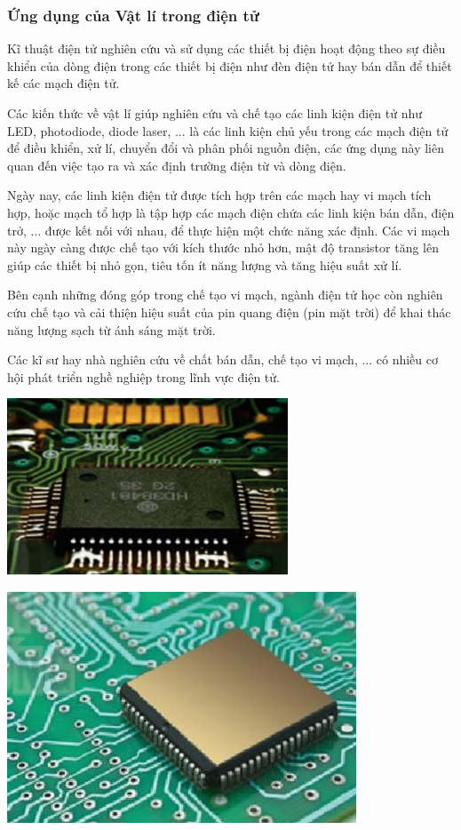 \subsubsection{Ứng dụng của Vật lí trong điện tử}
\begin{minipage}[l]{0.6\textwidth}
Kĩ thuật điện tử nghiên cứu và sử dụng các thiết bị điện hoạt động theo sự điều khiển của dòng điện trong các thiết bị điện như đèn điện tử hay bán dẫn để thiết kế các mạch điện tử.

Các kiến thức về vật lí giúp nghiên cứu và chế tạo các linh kiện điện tử như LED, photodiode, diode laser, ... là các linh kiện chủ yếu trong các mạch điện tử để điều khiển, xử lí, chuyển đổi và phân phối nguồn điện, các ứng dụng này liên quan đến việc tạo ra và xác định trường điện từ và dòng điện.

Ngày nay, các linh kiện điện tử được tích hợp trên các mạch hay vi mạch tích hợp, hoặc mạch tổ hợp là tập hợp các mạch điện chứa các linh kiện bán dẫn, điện trở, ... được kết nối với nhau, để thực hiện một chức năng xác định. Các vi mạch này ngày càng được chế tạo với kích thước nhỏ hơn, mật độ transistor tăng lên giúp các thiết bị nhỏ gọn, tiêu tốn ít năng lượng và tăng hiệu suất xử lí.

Bên cạnh những đóng góp trong chế tạo vi mạch, ngành điện tử học còn nghiên cứu chế tạo và cải thiện hiệu suất của pin quang điện (pin mặt trời) để khai thác năng lượng sạch từ ánh sáng mặt trời.

Các kĩ sư hay nhà nghiên cứu về chất bán dẫn, chế tạo vi mạch, ... có nhiều cơ hội phát triển nghề nghiệp trong lĩnh vực điện tử.
\end{minipage}
\begin{minipage}[r]{0.4\textwidth}
\begin{center}
	\includegraphics[scale=0.85]{../figs/G10-003-5.png}
\end{center}
\begin{center}
	\includegraphics[scale=0.7]{../figs/G10-003-6.png}
\end{center}
\end{minipage}
